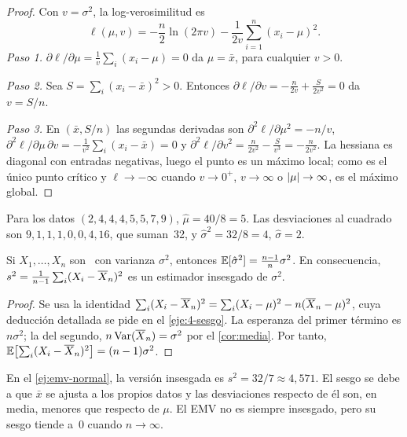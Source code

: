 \begin{proof}
Con $v=\sigma^{2}$, la log-verosimilitud es
\[
\ell(\mu,v)=-\frac n2\ln(2\pi v)-\frac{1}{2v}\sum_{i=1}^{n}(x_i-\mu)^{2}.
\]
\emph{Paso 1.} $\partial\ell/\partial\mu=\frac1v\sum_i(x_i-\mu)=0$ da $\mu=\bar x$, para cualquier $v>0$.

\emph{Paso 2.} Sea $S=\sum_i(x_i-\bar x)^{2}>0$. Entonces $\partial\ell/\partial v=-\frac{n}{2v}+\frac{S}{2v^{2}}=0$ da $v=S/n$.

\emph{Paso 3.} En $(\bar x,S/n)$ las segundas derivadas son $\partial^{2}\ell/\partial\mu^{2}=-n/v$, $\partial^{2}\ell/\partial\mu\,\partial v=-\frac{1}{v^{2}}\sum_i(x_i-\bar x)=0$ y $\partial^{2}\ell/\partial v^{2}=\frac{n}{2v^{2}}-\frac{S}{v^{3}}=-\frac{n}{2v^{2}}$. La hessiana es diagonal con entradas negativas, luego el punto es un máximo local; como es el único punto crítico y $\ell\to-\infty$ cuando $v\to 0^{+}$, $v\to\infty$ o $\lvert\mu\rvert\to\infty$, es el máximo global.
\end{proof}

\begin{ejemplo}\label{ej:emv-normal}
Para los datos $(2,4,4,4,5,5,7,9)$, $\hat\mu=40/8=5$. Las desviaciones al cuadrado son $9,1,1,1,0,0,4,16$, que suman~32, y $\hat\sigma^{2}=32/8=4$, $\hat\sigma=2$.
\end{ejemplo}

\begin{proposicion}\label{prop:sesgo}
Si $X_1,\dots,X_n$ son \iid\ con varianza $\sigma^{2}$, entonces $\mathbb{E}[\hat\sigma^{2}]=\frac{n-1}{n}\sigma^{2}$. En consecuencia, $s^{2}=\frac{1}{n-1}\sum_i(X_i-\overline{X}_n)^{2}$ es un estimador insesgado de $\sigma^{2}$.
\end{proposicion}

\begin{proof}
Se usa la identidad $\sum_i(X_i-\overline{X}_n)^{2}=\sum_i(X_i-\mu)^{2}-n(\overline{X}_n-\mu)^{2}$, cuya deducción detallada se pide en el \cref{eje:4-sesgo}. La esperanza del primer término es $n\sigma^{2}$; la del segundo, $n\operatorname{Var}(\overline{X}_n)=\sigma^{2}$ por el \cref{cor:media}. Por tanto, $\mathbb{E}\bigl[\sum_i(X_i-\overline{X}_n)^{2}\bigr]=(n-1)\sigma^{2}$.
\end{proof}

En el \cref{ej:emv-normal}, la versión insesgada es $s^{2}=32/7\approx 4{,}571$. El sesgo se debe a que $\bar x$ se ajusta a los propios datos y las desviaciones respecto de él son, en media, menores que respecto de $\mu$. El EMV no es siempre insesgado, pero su sesgo tiende a~0 cuando $n\to\infty$.

